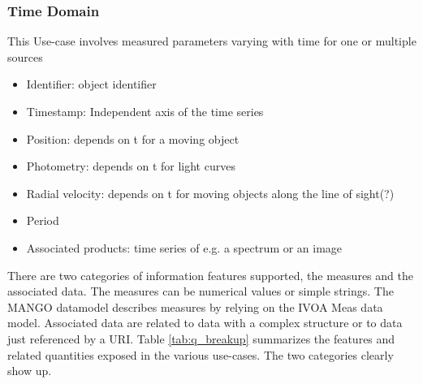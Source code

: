\documentclass[11pt,a4paper]{ivoa}
\begin{document}
\subsubsection{Time Domain }

This Use-case involves measured parameters varying with time
for one or multiple sources

 \begin{itemize}
    \item Identifier: object identifier
    \item Timestamp: Independent axis of the time series
    \item Position: depends on t for a moving object
    \item Photometry: depends on t for light curves
    \item Radial velocity: depends on t for moving objects along the line of sight(?)
    \item Period
    \item Associated products: time series of e.g. a spectrum or an image

\end{itemize}

There are two categories of information features supported, the measures and the associated data. The measures
 can be numerical values or simple strings. The MANGO datamodel describes measures by relying on the IVOA Meas data model.%
 Associated data are related to data with a complex structure or to data just referenced by a URI. Table  \ref{tab:q_breakup} summarizes the features and related quantities exposed in the various use-cases. The two categories clearly show up.
\end{document}
